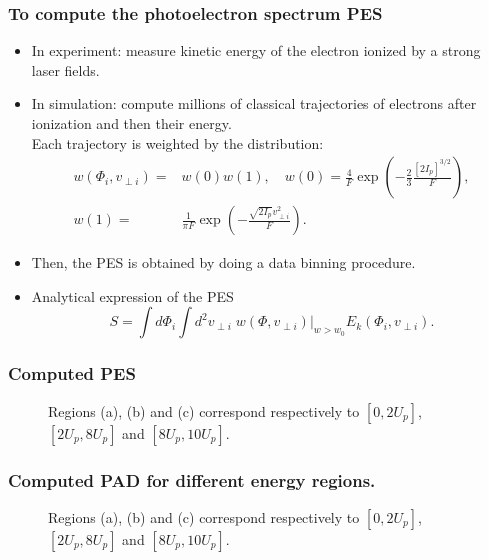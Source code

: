 \documentclass{beamer}
\begin{document}
\begin{frame}
\frametitle{To compute the photoelectron spectrum PES}
\begin{itemize}
\item
In experiment: measure kinetic energy of the electron ionized by a strong laser fields.
\item
In simulation: compute millions of classical trajectories of electrons after ionization and then their energy. \\
Each trajectory is weighted by the distribution:
\begin{align} 
\label{ADK_distribution}
w(\Phi_{i},v_{\perp i})=&w(0)w(1), \quad w(0)=\frac{4}{F}\exp(-\frac{2}{3}\frac{[2I_{p}]^{3/2}}{F}), \\
w(1)=&\frac{1}{\pi F}\exp(-\frac{\sqrt{2I_{p}}v_{\perp i}^{2}}{F}).
\end{align}
\item
Then, the PES is obtained by doing a data binning procedure.
\item
Analytical expression of the PES
\begin{equation}
\label{ATI_analytical_weight}
S= \int d\Phi_{i} \int d^{2}v_{\perp i}  \; \left. w(\Phi, v_{\perp i}) \right\vert_{w>w_{0}}  E_{k}(\Phi_{i}, v_{\perp i}).
\end{equation}
\end{itemize}
\end{frame}


\begin{frame}
\frametitle{Computed PES}
\begin{figure}[htp]
\vspace{6cm}
 \resizebox{0.6\textwidth}{!}{}
 \caption{Regions (a), (b) and (c) correspond respectively to $[0, 2U_{p}]$, $[2U_{p}, 8U_{p}]$ and $[8U_{p}, 10U_{p}]$.}
\end{figure}

\end{frame}


\begin{frame}
\frametitle{Computed PAD for different energy regions.}
\begin{figure}[htp]
 \resizebox{0.8\textwidth}{!}{}
 \caption{Regions (a), (b) and (c) correspond respectively to $[0, 2U_{p}]$, $[2U_{p}, 8U_{p}]$ and $[8U_{p}, 10U_{p}]$.}
\end{figure}

\end{frame}
\end{document}
